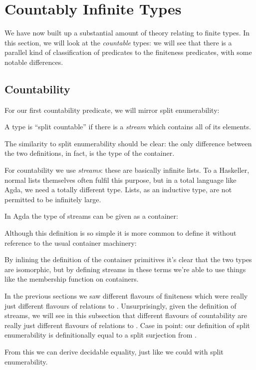 \section{Countably Infinite Types} \label{infinite}
We have now built up a substantial amount of theory relating to finite types.
In this section, we will look at the \emph{countable} types: we will see that
there is a parallel kind of classification of predicates to the finiteness
predicates, with some notable differences.
\subsection{Countability}
For our first countability predicate, we will mirror split enumerability:
\begin{definition}
  A type is ``split countable'' if there is a \emph{stream} which contains all
  of its elements.
  \begin{agdalisting*}
  \end{agdalisting*}
\end{definition}
The similarity to split enumerability should be clear: the only difference
between the two definitions, in fact, is the type of the container.

For countability we use \emph{streams}: these are basically infinite lists.
To a Haskeller, normal lists themselves often fulfil this purpose, but in a
total language like Agda, we need a totally different type.
Lists, as an inductive type, are not permitted to be infinitely large.
\begin{definition}[Streams]
  In Agda the type of streams can be given as a container:
  \begin{agdalisting*}
  \end{agdalisting*}
  Although this definition is so simple it is more common to define it without
  reference to the usual container machinery:
  \begin{agdalisting*}
  \end{agdalisting*}
  By inlining the definition of the container primitives it's clear that the two
  types are isomorphic, but by defining streams in these terms we're able to
  use things like the membership function on containers.
\end{definition}

In the previous sections we saw different flavours of finiteness which were
really just different flavours of relations to .
Unsurprisingly, given the definition of streams, we will see in this subsection
that different flavours of countability are really just different flavours of
relations to \Nat.
Case in point: our definition of split enumerability is definitionally equal to
a split surjection from \Nat.
\begin{agdalisting*}
\end{agdalisting*}
From this we can derive decidable equality, just like we could with split
enumerability. 

